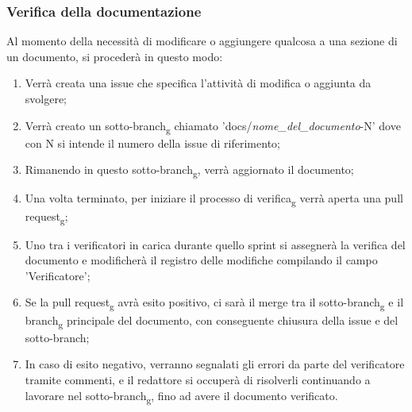 \subsubsection{Verifica della documentazione} Al momento della necessità di modificare o aggiungere qualcosa a una sezione di
un documento, si procederà in questo modo:
\begin{enumerate}
    \item Verrà creata una issue che specifica l'attività di modifica o aggiunta da
          svolgere;
    \item Verrà creato un sotto-branch\textsubscript{g} chiamato
          'docs/\textit{nome\_del\_documento}-N' dove con N si intende il numero della
          issue di riferimento;
    \item Rimanendo in questo sotto-branch\textsubscript{g}, verrà aggiornato il
          documento;
    \item Una volta terminato, per iniziare il processo di verifica\textsubscript{g}
          verrà aperta una pull request\textsubscript{g};
    \item Uno tra i verificatori in carica durante quello sprint si assegnerà la verifica
          del documento e modificherà il registro delle modifiche compilando il campo
          'Verificatore';
    \item Se la pull request\textsubscript{g} avrà esito positivo, ci sarà il merge tra
          il sotto-branch\textsubscript{g} e il branch\textsubscript{g} principale del
          documento, con conseguente chiusura della issue e del sotto-branch;
    \item In caso di esito negativo, verranno segnalati gli errori da parte del
          verificatore tramite commenti, e il redattore si occuperà di risolverli
          continuando a lavorare nel sotto-branch\textsubscript{g}, fino ad avere il
          documento verificato.
\end{enumerate}

